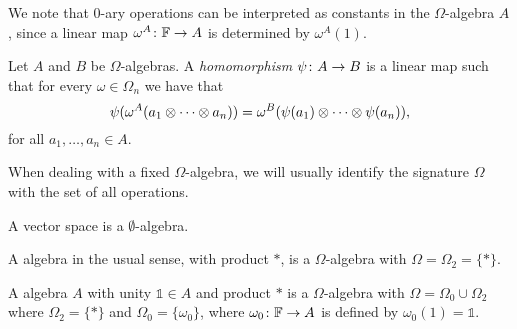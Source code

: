 We note that $0$-ary operations can be interpreted as constants in the $\Omega$-algebra $A$, since a linear map $\omega^A\colon \mathbb{F} \to A$ is determined by $\omega^A(1)$.

\begin{defi}
    Let $A$ and $B$ be $\Omega$-algebras. 
    A \emph{homomorphism} $\psi\colon A \to B$ is a linear map such that for every $\omega \in \Omega_n$ we have that
    \[
        \psi( \omega^A (a_1 \otimes \cdots \otimes a_n) ) = \omega^B ( \psi(a_1) \otimes \cdots \otimes \psi(a_n) ),
    \]
    for all $a_1, \ldots, a_n \in A$.
\end{defi}

When dealing with a fixed $\Omega$-algebra, we will usually identify the signature $\Omega$ with the set of all operations.

\begin{ex}\label{ex:omega-vec-space}
    A vector space is a $\emptyset$-algebra.
\end{ex}

\begin{ex}\label{ex:omega-algebra}
    A algebra in the usual sense, with product $*$, is a $\Omega$-algebra with $\Omega = \Omega_2 = \{ * \}$. 
\end{ex}

\begin{ex}
    A algebra $A$ with unity $\mathds{1} \in A$ and product $*$ is a  $\Omega$-algebra with $\Omega = \Omega_0 \cup \Omega_2$ where $\Omega_2 = \{ * \}$ and $\Omega_0 = \{ \omega_0 \}$, where $\omega_0\colon \mathbb{F} \to A$ is defined by $\omega_0 (1) = \mathds 1$.
\end{ex}


